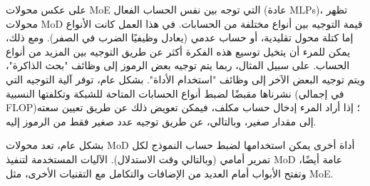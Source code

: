\documentclass[11pt, a4paper, onecolumn, logo, copyright]{googledeepmind}
\begin{document}
على عكس محولات MoE التي توجه بين نفس الحساب الفعال (عادة MLPs)، تظهر محولات MoD قيمة التوجيه بين أنواع مختلفة من الحسابات. في هذا العمل كانت الأنواع إما كتلة محول تقليدية، أو حساب عدمي (يعادل وظيفيًا الضرب في الصفر). ومع ذلك، يمكن للمرء أن يتخيل توسيع هذه الفكرة أكثر عن طريق التوجيه بين المزيد من أنواع الحساب. على سبيل المثال، ربما يتم توجيه بعض الرموز إلى وظائف "بحث الذاكرة"، ويتم توجيه البعض الآخر إلى وظائف "استخدام الأداة". بشكل عام، توفر آلية التوجيه التي نشرناها مقبضًا لضبط أنواع الحسابات المتاحة للشبكة وتكلفتها النسبية (في إجمالي FLOP)؛ إذا أراد المرء إدخال حساب مكلف، فيمكن تعويض ذلك عن طريق تعيين سعته إلى مقدار صغير، وبالتالي، عن طريق توجيه عدد صغير فقط من الرموز إليه.

بشكل عام، تعد محولات MoD أداة أخرى يمكن استخدامها لضبط حساب النموذج لكل تمرير أمامي (وبالتالي وقت الاستدلال). الآليات المستخدمة لتنفيذ MoD عامة أيضًا، وتفتح الأبواب أمام العديد من الإضافات والتكامل مع التقنيات الأخرى، مثل MoE.

\end{document}
